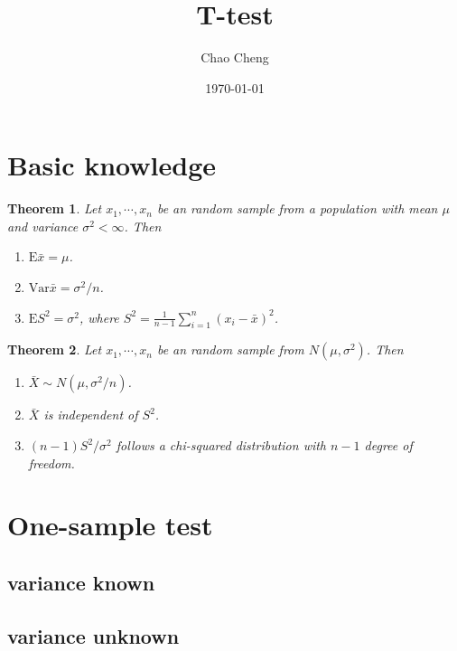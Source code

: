 \documentclass[a4paper,12pt]{article}
\title{T-test}
\author{Chao Cheng}
\date{\today}
\newtheorem{thm}{Theorem}
\begin{document}
\maketitle

\section{Basic knowledge}
\label{sec:basic-knowledge}

\begin{thm}
  Let $x_1, \cdots, x_n$ be an random sample from a population with mean $\mu$ and variance $\sigma^2 <\infty$. Then
  \begin{enumerate}
  \item $\mathrm{E}\bar{x} = \mu$.
  \item $\mathrm{Var}\bar{x} = \sigma^2 / n$.
  \item $\mathrm{E}S^2 = \sigma^2$, where $S^2 = \frac{1}{n - 1}\sum\limits_{i = 1}^n\left(x_i - \bar{x}\right)^2$.
  \end{enumerate}
\end{thm}

\begin{thm}
  Let $x_1, \cdots, x_n$ be an random sample from $N\left(\mu, \sigma^2\right)$. Then
  \begin{enumerate}
  \item $\bar{X} \sim N\left(\mu, \sigma^2 / n\right)$.
  \item $\bar{X}$ is independent of $S^2$.
  \item $\left(n - 1\right)S^2 / \sigma^2$ follows a chi-squared distribution with $n - 1$ degree of freedom.
  \end{enumerate}
\end{thm}

\section{One-sample test}
\label{sec:one-sample}

\subsection{variance known}
\label{sec:variance-known}

\subsection{variance unknown}
\label{sec:variance-unknown}
\end{document}
